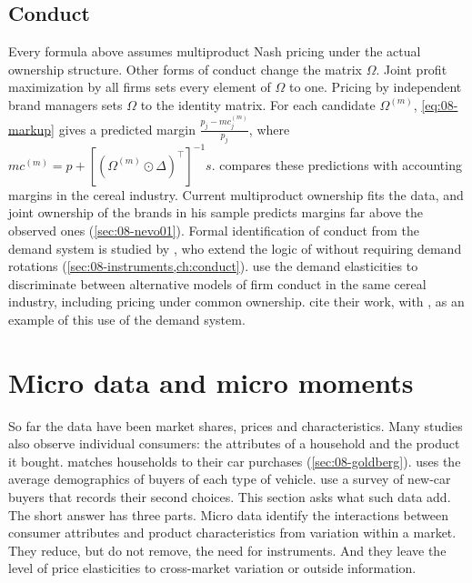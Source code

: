 \subsection{Conduct}\label{sec:08-supply-conduct}

Every formula above assumes multiproduct Nash pricing under the actual ownership structure. Other forms of conduct
change the matrix $\Omega$. Joint profit maximization by all firms sets every element of $\Omega$ to one. Pricing by
independent brand managers sets $\Omega$ to the identity matrix. For each candidate $\Omega^{(m)}$, \eqref{eq:08-markup}
gives a predicted margin $\frac{p_j - mc^{(m)}_j}{p_j}$, where $mc^{(m)} = p + [(\Omega^{(m)} \odot \Delta)^\top]^{-1}s$.
\citet{Nevo2001} compares these predictions with accounting margins in the cereal industry. Current multiproduct
ownership fits the data, and joint ownership of the brands in his sample predicts margins far above the observed ones
(\cref{sec:08-nevo01}). Formal identification of conduct from the demand system is studied by
\citet[Section~6]{BerryHaile2014}, who extend the logic of \citet{Bresnahan1982} without requiring demand rotations
(\cref{sec:08-instruments,ch:conduct}). \citet{BackusConlonSinkinson2021} use the demand elasticities to
discriminate between alternative models of firm conduct in the same cereal industry, including pricing under
common ownership. \citet[p.~1140]{BerryHaile2024} cite their work, with \citet{BerryHaile2014}, as an example of
this use of the demand system.

\section{Micro data and micro moments}\label{sec:08-micro}

So far the data have been market shares, prices and characteristics. Many studies also observe individual consumers:
the attributes of a household and the product it bought. \citet{Goldberg1995} matches households to their car
purchases (\cref{sec:08-goldberg}). \citet{Petrin2002} uses the average demographics of buyers of each type of
vehicle. \citet{BerryLevinsohnPakes2004} use a survey of new-car buyers that records their second choices. This section asks
what such data add. The short answer has three parts. Micro data identify the interactions between consumer
attributes and product characteristics from variation within a market. They reduce, but do not remove, the need for
instruments. And they leave the level of price elasticities to cross-market variation or outside information.


